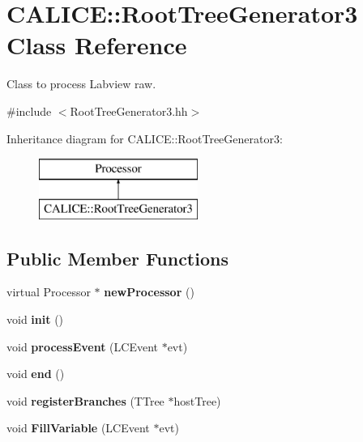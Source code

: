 \section{C\-A\-L\-I\-C\-E\-:\-:Root\-Tree\-Generator3 Class Reference}
\label{classCALICE_1_1RootTreeGenerator3}


Class to process Labview raw.  




{\ttfamily \#include $<$Root\-Tree\-Generator3.\-hh$>$}

Inheritance diagram for C\-A\-L\-I\-C\-E\-:\-:Root\-Tree\-Generator3\-:\begin{figure}[H]
\begin{center}
\leavevmode
\includegraphics[height=2.000000cm]{classCALICE_1_1RootTreeGenerator3}
\end{center}
\end{figure}
\subsection*{Public Member Functions}
\begin{DoxyCompactItemize}
\item 
virtual Processor $\ast$ {\bfseries new\-Processor} ()\label{classCALICE_1_1RootTreeGenerator3_a1385eeb9f0fa76ace54e2176f995c831}

\item 
void {\bfseries init} ()\label{classCALICE_1_1RootTreeGenerator3_a994dbd1c8750e4d88b8ebdedf90f34aa}

\item 
void {\bfseries process\-Event} (L\-C\-Event $\ast$evt)\label{classCALICE_1_1RootTreeGenerator3_a4f2ca19228fdd754e01b616665254f86}

\item 
void {\bfseries end} ()\label{classCALICE_1_1RootTreeGenerator3_a12de0fe12752ee8db6d40ea63dfa91b6}

\item 
void {\bfseries register\-Branches} (T\-Tree $\ast$host\-Tree)\label{classCALICE_1_1RootTreeGenerator3_a14c95a9a596c0fa8bbbf171f26f67238}

\item 
void {\bfseries Fill\-Variable} (L\-C\-Event $\ast$evt)\label{classCALICE_1_1RootTreeGenerator3_a07bde3d14b4a5bc90f24978a3e8b95d5}

\end{DoxyCompactItemize}
